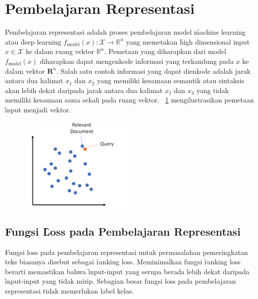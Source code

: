 \section{Pembelajaran Representasi}
Pembelajaran representasi adalah proses pembelajaran model \f{machine learning} atau \f{deep learning} $f_{\text{model}}(x): \mathcal{X} \rightarrow \mathbb{R}^n$ yang memetakan \f{high dimensional input} $x \in \mathcal{X}$ ke dalam ruang vektor $\mathbb{R}^n$. Pemetaan yang diharapkan dari model $f_{\text{model}}(x)$ diharapkan dapat mengenkode informasi yang terkandung pada $x$ ke dalam vektor $\mathbf{R}^n$. Salah satu contoh informasi yang dapat dienkode adalah jarak antara dua kalimat $x_1$ dan $x_2$ yang memiliki kesamaan semantik atau sintaksis akan lebih dekat daripada jarak antara dua kalimat $x_1$ dan $x_3$ yang tidak memiliki kesamaan sama sekali pada ruang vektor. \pic~\ref{fig:reps-learning} mengilustrasikan pemetaan \f{input} menjadi vektor.
\begin{figure}
    \centering
    \includegraphics[width=0.5\textwidth]{assets/pics/reps-learning.png}
    \label{fig:reps-learning}
\end{figure}

\subsection{Fungsi \f{Loss} pada Pembelajaran Representasi}


Fungsi loss pada pembelajaran representasi untuk permasalahan pemeringkatan teks biasanya disebut sebagai \f{ranking loss}. Meminimalkan fungsi \f{ranking loss} berarti memastikan bahwa \f{input-input} yang serupa berada lebih dekat daripada \f{input-input} yang tidak mirip. Sebagian besar fungsi loss pada pembelajaran representasi tidak memerlukan label kelas.

